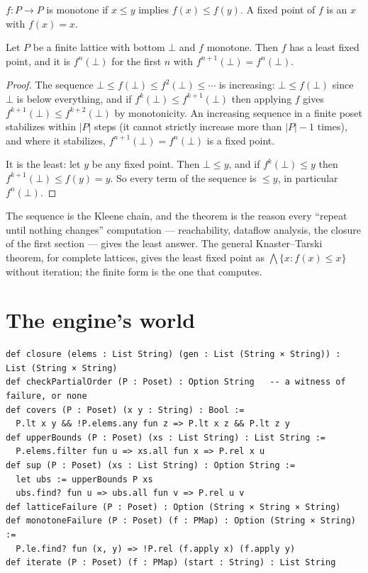 \begin{definition}
  $f : P \to P$ is monotone if $x \le y$ implies $f(x) \le f(y)$. A fixed point of $f$ is an $x$
  with $f(x) = x$.
\end{definition}

\begin{theorem}
  Let $P$ be a finite lattice with bottom $\bot$ and $f$ monotone. Then $f$ has a least fixed
  point, and it is $f^n(\bot)$ for the first $n$ with $f^{n+1}(\bot) = f^n(\bot)$.
\end{theorem}
\begin{proof}
  The sequence $\bot \le f(\bot) \le f^2(\bot) \le \cdots$ is increasing: $\bot \le f(\bot)$
  since $\bot$ is below everything, and if $f^k(\bot) \le f^{k+1}(\bot)$ then applying $f$ gives
  $f^{k+1}(\bot) \le f^{k+2}(\bot)$ by monotonicity. An increasing sequence in a finite poset
  stabilizes within $|P|$ steps (it cannot strictly increase more than $|P| - 1$ times), and
  where it stabilizes, $f^{n+1}(\bot) = f^n(\bot)$ is a fixed point.

  It is the least: let $y$ be any fixed point. Then $\bot \le y$, and if $f^k(\bot) \le y$ then
  $f^{k+1}(\bot) \le f(y) = y$. So every term of the sequence is $\le y$, in particular
  $f^n(\bot)$.
\end{proof}

The sequence is the Kleene chain, and the theorem is the reason every ``repeat until nothing
changes'' computation --- reachability, dataflow analysis, the closure of the first section ---
gives the least answer. The general Knaster--Tarski theorem, for complete lattices, gives the
least fixed point as $\bigwedge \{x : f(x) \le x\}$ without iteration; the finite form is the
one that computes.

\section{The engine's world}

\begin{verbatim}
def closure (elems : List String) (gen : List (String × String)) : List (String × String)
def checkPartialOrder (P : Poset) : Option String   -- a witness of failure, or none
def covers (P : Poset) (x y : String) : Bool :=
  P.lt x y && !P.elems.any fun z => P.lt x z && P.lt z y
def upperBounds (P : Poset) (xs : List String) : List String :=
  P.elems.filter fun u => xs.all fun x => P.rel x u
def sup (P : Poset) (xs : List String) : Option String :=
  let ubs := upperBounds P xs
  ubs.find? fun u => ubs.all fun v => P.rel u v
def latticeFailure (P : Poset) : Option (String × String × String)
def monotoneFailure (P : Poset) (f : PMap) : Option (String × String) :=
  P.le.find? fun (x, y) => !P.rel (f.apply x) (f.apply y)
def iterate (P : Poset) (f : PMap) (start : String) : List String
\end{verbatim}

